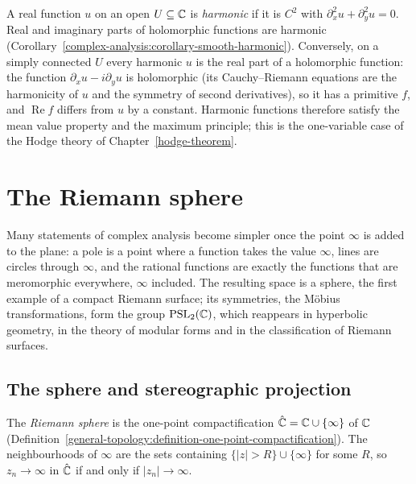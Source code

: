\begin{remark}\label{complex-analysis:remark-harmonic}
A real function $u$ on an open $U \subseteq \mathbb{C}$ is \emph{harmonic} if it is $C^2$ with $\partial_x^2u + \partial_y^2u = 0$. Real and imaginary parts of holomorphic functions are harmonic
(Corollary~\ref{complex-analysis:corollary-smooth-harmonic}). Conversely, on a simply connected $U$ every harmonic $u$ is the real part of a holomorphic function: the function
$\partial_xu - i\partial_yu$ is holomorphic (its Cauchy--Riemann equations are the harmonicity of $u$ and the symmetry of second derivatives), so it has a primitive $f$, and $\operatorname{Re}f$ differs from
$u$ by a constant. Harmonic functions therefore satisfy the mean value property and the maximum principle; this is the one-variable case of the Hodge theory of Chapter~\ref{hodge-theorem}.
\end{remark}

\section{The Riemann sphere}\label{complex-analysis:section-riemann-sphere}

Many statements of complex analysis become simpler once the point $\infty$ is added to the plane: a pole is a point where a function takes the value $\infty$, lines are circles through $\infty$,
and the rational functions are exactly the functions that are meromorphic everywhere, $\infty$ included. The resulting space is a sphere, the first example of a compact Riemann surface; its
symmetries, the M\"obius transformations, form the group $\mathrm{PSL}_2(\mathbb{C})$, which reappears in hyperbolic geometry, in the theory of modular forms and in the classification of Riemann surfaces.

\subsection{The sphere and stereographic projection}\label{complex-analysis:subsection-sphere}

\begin{definition}\label{complex-analysis:definition-riemann-sphere}
The \emph{Riemann sphere} is the one-point compactification $\hat{\mathbb{C}} = \mathbb{C} \cup \{\infty\}$ of $\mathbb{C}$ (Definition~\ref{general-topology:definition-one-point-compactification}). The neighbourhoods of $\infty$ are the sets
containing $\{|z| > R\} \cup \{\infty\}$ for some $R$, so $z_n \to \infty$ in $\hat{\mathbb{C}}$ if and only if $|z_n| \to \infty$.
\end{definition}

